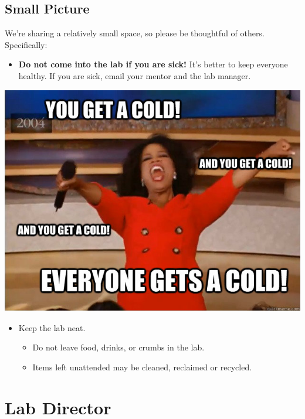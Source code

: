 \documentclass[]{book}
\providecommand{\tightlist}{%
  \setlength{\itemsep}{0pt}\setlength{\parskip}{0pt}}
\begin{document}
\hypertarget{small-picture}{%
\subsection{Small Picture}\label{small-picture}}

We're sharing a relatively small space, so please be thoughtful of others. Specifically:

\begin{itemize}
\tightlist
\item
  \textbf{Do not come into the lab if you are sick!} It's better to keep everyone healthy. If you are sick, email your mentor and the lab manager.
\end{itemize}

\includegraphics{images/sick.jpg}

\begin{itemize}
\tightlist
\item
  Keep the lab neat.

  \begin{itemize}
  \tightlist
  \item
    Do not leave food, drinks, or crumbs in the lab.\\
  \item
    Items left unattended may be cleaned, reclaimed or recycled.
  \end{itemize}
\end{itemize}

\hypertarget{lab-director}{%
\section{Lab Director}\label{lab-director}}
\end{document}

